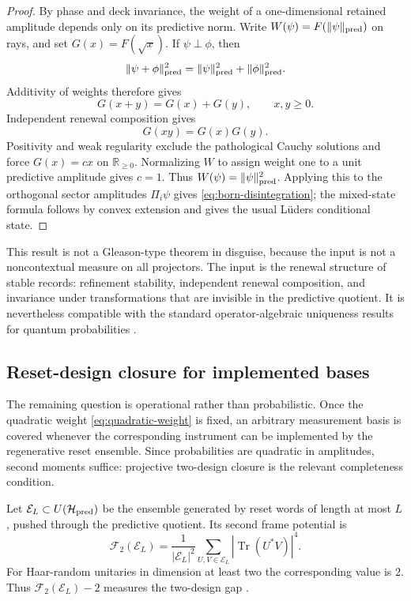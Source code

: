 \documentclass[11pt]{article}
\numberwithin{equation}{section}
\theoremstyle{definition}
\theoremstyle{remark}
\newcommand{\R}{\mathbb R}
\newcommand{\Hilb}{\mathcal H}
\newcommand{\Tr}{\operatorname{Tr}}
\begin{document}
\begin{proof}
By phase and deck invariance, the weight of a one-dimensional retained amplitude depends only on its predictive norm.  Write \(W(\psi)=F(\|\psi\|_{\rm pred})\) on rays, and set \(G(x)=F(\sqrt{x})\).  If \(\psi\perp\phi\), then
\[
  \|\psi+\phi\|_{\rm pred}^{2}
  =
  \|\psi\|_{\rm pred}^{2}
  +
  \|\phi\|_{\rm pred}^{2}.
\]
Additivity of weights therefore gives
\begin{equation}
\label{eq:cauchy-additive}
  G(x+y)=G(x)+G(y),
  \qquad x,y\ge0.
\end{equation}
Independent renewal composition gives
\begin{equation}
\label{eq:cauchy-multiplicative}
  G(xy)=G(x)G(y).
\end{equation}
Positivity and weak regularity exclude the pathological Cauchy solutions and force \(G(x)=cx\) on \(\R_{\ge0}\).  Normalizing \(W\) to assign weight one to a unit predictive amplitude gives \(c=1\).  Thus \(W(\psi)=\|\psi\|_{\rm pred}^{2}\).  Applying this to the orthogonal sector amplitudes \(\Pi_i\psi\) gives \eqref{eq:born-disintegration}; the mixed-state formula follows by convex extension and gives the usual L\"uders conditional state.
\end{proof}

This result is not a Gleason-type theorem in disguise, because the input is not a noncontextual measure on all projectors.  The input is the renewal structure of stable records: refinement stability, independent renewal composition, and invariance under transformations that are invisible in the predictive quotient.  It is nevertheless compatible with the standard operator-algebraic uniqueness results for quantum probabilities \cite{Gleason1957,Busch2003}.

\subsection{Reset-design closure for implemented bases}
\label{subsec:reset-design}

The remaining question is operational rather than probabilistic.  Once the quadratic weight \eqref{eq:quadratic-weight} is fixed, an arbitrary measurement basis is covered whenever the corresponding instrument can be implemented by the regenerative reset ensemble.  Since probabilities are quadratic in amplitudes, second moments suffice: projective two-design closure is the relevant completeness condition.

Let \(\mathcal E_L\subset U(\Hilb_{\rm pred})\) be the ensemble generated by reset words of length at most \(L\), pushed through the predictive quotient.  Its second frame potential is
\begin{equation}
\label{eq:frame-potential}
  \mathcal F_2(\mathcal E_L)
  =
  \frac{1}{|\mathcal E_L|^2}
  \sum_{U,V\in\mathcal E_L}
  \left|\Tr(U^\ast V)\right|^4 .
\end{equation}
For Haar-random unitaries in dimension at least two the corresponding value is \(2\).  Thus \(\mathcal F_2(\mathcal E_L)-2\) measures the two-design gap \cite{AmbainisEmerson2007,Dankert2009}.
\end{document}
